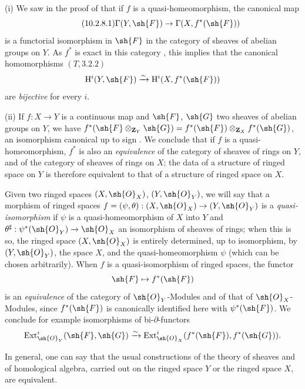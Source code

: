 \begin{remarks}[10.2.8]
\label{IV.10.2.8}
(i) We saw in the proof of  that if $f$ is a quasi-homeomorphism, the canonical map
\begin{equation}
\label{IV.10.2.8.1}
\tag{10.2.8.1}
\Gamma(Y,\sh{F})\to\Gamma(X,f^*(\sh{F}))
\end{equation}
is a functorial isomorphism in $\sh{F}$ in the category of sheaves of abelian groups on $Y$.
As $f^*$ is exact in this category , this implies that the canonical homomorphisms $(T,3.2.2)$
\[
  \mathrm{H}^i(Y,\sh{F})\xrightarrow{\sim}\mathrm{H}^i(X,f^*(\sh{F}))
\]
are \emph{bijective} for every $i$.

(ii) If $f:X\to Y$ is a continuous map and $\sh{F}$, $\sh{G}$ two sheaves of abelian groups on $Y$, we have $f^*(\sh{F}\otimes_{\mathbf{Z}_Y}\sh{G})=f^*(\sh{F})\otimes_{\mathbf{Z}_X}f^*(\sh{G})$, an isomorphism canonical up to sign .
We conclude that if $f$ is a quasi-homeomorphism, $f^*$ is also an \emph{equivalence} of the category of sheaves of rings on $Y$, and of the category of sheaves of rings on $X$; the data of a structure of ringed space on $Y$ is therefore equivalent to that of a structure of ringed space on $X$.

Given two ringed spaces $(X,\sh{O}_X)$, $(Y,\sh{O}_Y)$, we will say that a morphism of ringed spaces $f=(\psi,\theta):(X,\sh{O}_X)\to(Y,\sh{O}_Y)$ is a \emph{quasi-isomorphism} if $\psi$ is a quasi-homeomorphism of $X$ into $Y$ and $\theta^\sharp:\psi^*(\sh{O}_Y)\to\sh{O}_X$ an isomorphism of sheaves of rings; when this is so, the ringed space $(X,\sh{O}_X)$ is entirely determined, up to isomorphism, by $(Y,\sh{O}_Y)$, the space $X$, and the quasi-homeomorphism $\psi$ (which can be chosen arbitrarily).
When $f$ is a quasi-isomorphism of ringed spaces, the functor
\[
  \sh{F}\mapsto f^*(\sh{F})
\]
is an \emph{equivalence} of the category of $\sh{O}_Y$-Modules and of that of $\sh{O}_X$-Modules, since $f^*(\sh{F})$ is canonically identified here with $\psi^*(\sh{F})$.
We conclude for example isomorphisms of bi-$\partial$-functors
\[
  \operatorname{Ext}^i_{\sh{O}_Y}(\sh{F},\sh{G})\xrightarrow{\sim}\operatorname{Ext}^i_{\sh{O}_X}(f^*(\sh{F}),f^*(\sh{G})).
\]

In general, one can say that the usual constructions of the theory of sheaves and of homological algebra, carried out on the ringed space $Y$ or the ringed space $X$, are equivalent.
\end{remarks}

